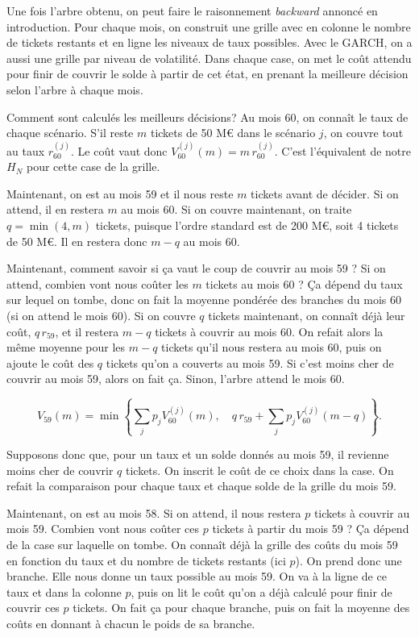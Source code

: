 \documentclass[11pt,a4paper]{article}
\begin{document}
\clearpage
\bigskip

Une fois l'arbre obtenu, on peut faire le raisonnement \emph{backward} annoncé en introduction. Pour chaque mois, on construit une grille avec en colonne le nombre de tickets restants et en ligne les niveaux de taux possibles. Avec le GARCH, on a aussi une grille par niveau de volatilité. Dans chaque case, on met le coût attendu pour finir de couvrir le solde à partir de cet état, en prenant la meilleure décision selon l'arbre à chaque mois.

\medskip

Comment sont calculés les meilleurs décisions? Au mois 60, on connaît le taux de chaque scénario. S'il reste $m$ tickets de 50 M€ dans le scénario $j$, on couvre tout au taux $r_{60}^{(j)}$. Le coût vaut donc $V_{60}^{(j)}(m)=m\,r_{60}^{(j)}$. C'est l'équivalent de notre $H_N$ pour cette case de la grille.

\medskip

Maintenant, on est au mois 59 et il nous reste $m$ tickets avant de décider. Si on attend, il en restera $m$ au mois 60. Si on couvre maintenant, on traite $q=\min(4,m)$ tickets, puisque l'ordre standard est de 200 M€, soit 4 tickets de 50 M€. Il en restera donc $m-q$ au mois 60.
\medskip 

Maintenant, comment savoir si ça vaut le coup de couvrir au mois 59 ? Si on attend, combien vont nous coûter les $m$ tickets au mois 60 ? Ça dépend du taux sur lequel on tombe, donc on fait la moyenne pondérée des branches du mois 60 (si on attend le mois 60). Si on couvre $q$ tickets maintenant, on connaît déjà leur coût, $q\,r_{59}$, et il restera $m-q$ tickets à couvrir au mois 60. On refait alors la même moyenne pour les $m-q$ tickets qu'il nous restera au mois 60, puis on ajoute le coût des $q$ tickets qu'on a couverts au mois 59. Si c'est moins cher de couvrir au mois 59, alors on fait ça. Sinon, l'arbre attend le mois 60.

$$
V_{59}(m)=\min\left\{\sum_j p_j V_{60}^{(j)}(m),\quad q\,r_{59}+\sum_j p_j V_{60}^{(j)}(m-q)\right\}.
$$

\bigskip

Supposons donc que, pour un taux et un solde donnés au mois 59, il revienne moins cher de couvrir $q$ tickets. On inscrit le coût de ce choix dans la case. On refait la comparaison pour chaque taux et chaque solde de la grille du mois 59.
\medskip 

Maintenant, on est au mois 58. Si on attend, il nous restera $p$ tickets à couvrir au mois 59. Combien vont nous coûter ces $p$ tickets à partir du mois 59 ? Ça dépend de la case sur laquelle on tombe. On connaît déjà la grille des coûts du mois 59 en fonction du taux et du nombre de tickets restants (ici $p$). On prend donc une branche. Elle nous donne un taux possible au mois 59. On va à la ligne de ce taux et dans la colonne $p$, puis on lit le coût qu'on a déjà calculé pour finir de couvrir ces $p$ tickets. On fait ça pour chaque branche, puis on fait la moyenne des coûts en donnant à chacun le poids de sa branche.
\medskip
\end{document}
